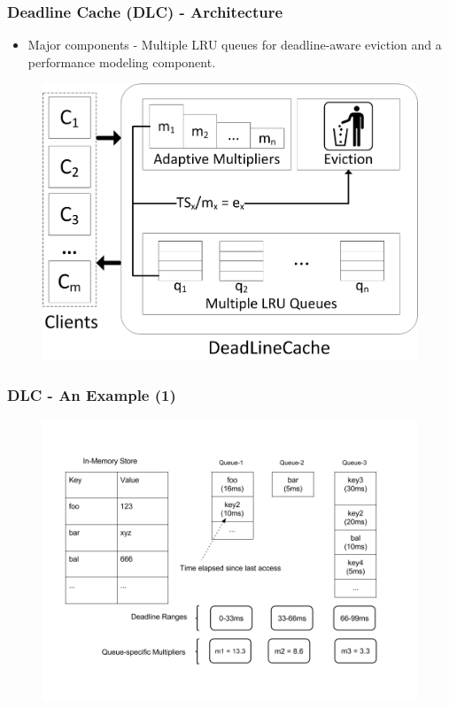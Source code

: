 \documentclass{beamer}
\begin{document}
\begin{frame}
  \frametitle{Deadline Cache (DLC) - Architecture}
  \begin{itemize}
  \item Major components - Multiple LRU queues for deadline-aware eviction and
    a performance modeling component.
  \end{itemize}
  \begin{figure}
    \begin{center}
      \centerline{\includegraphics[scale=0.8]{img/DLC.png}}
    \end{center}
  \end{figure}
\end{frame}

\begin{frame}
  \frametitle{DLC - An Example (1)}
  \begin{figure}
    \begin{center}
      \centerline{\includegraphics[scale=0.33]{img/DLC2.png}}
    \end{center}
  \end{figure}
\end{frame}
\end{document}
